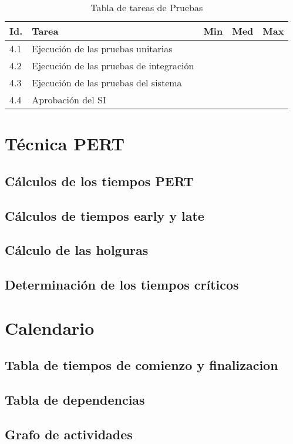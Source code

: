 \documentclass[11pt,a4paper,spanish,twoside]{report}
\begin{document}
\begin{table}[!h]
\centering
  \begin{tabular}{|p{0.8cm}||p{8cm}||p{0.75cm}|p{0.75cm}|p{0.75cm}|}
    \hline
    \textbf{Id.} & \textbf{Tarea} & \textbf{Min} &
    \textbf{Med} & \textbf{Max}\\
    \hline
    4.1 & Ejecución de las pruebas unitarias & & & \\
    \hline
    4.2 & Ejecución de las pruebas de integración & & &\\
    \hline
    4.3 & Ejecución de las pruebas del sistema & & &\\
    \hline
    4.4 & Aprobación del SI & & & \\
    \hline
  \end{tabular}
  \caption{Tabla de tareas de Pruebas} \label{Tab:tareas4}
\end{table}


\chapter{Técnica PERT}
\section{Cálculos de los tiempos PERT}
\section{Cálculos de tiempos early y late}
\section{Cálculo de las holguras}
\section{Determinación de los tiempos críticos}

\chapter{Calendario}
\section{Tabla de tiempos de comienzo y finalizacion}
\section{Tabla de dependencias}
\section{Grafo de actividades}


 

\end{document}
